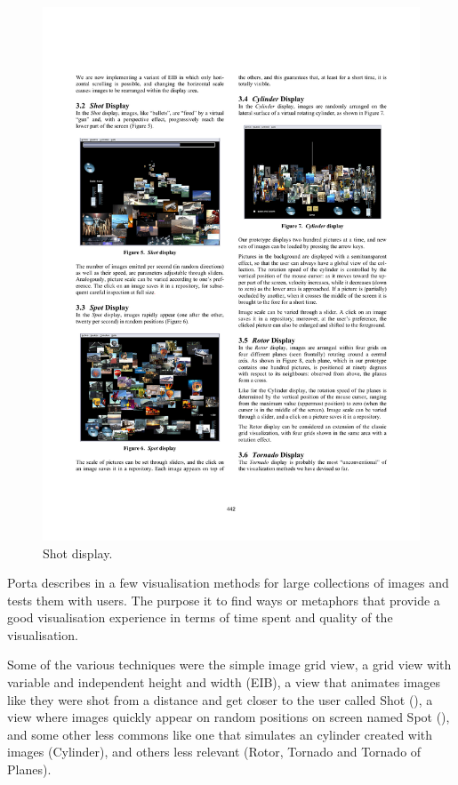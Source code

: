 \begin{figure}[ht]
\begin{minipage}[b]{0.5\textwidth}
		\includegraphics[width=\textwidth]{imgs/Porta-shot}
		\caption{Shot display.}
		\label{fig:porta-shot}
	\end{minipage}
\end{figure}

Porta describes in \cite{Porta:2006p416} a few visualisation methods for large collections of images and tests them with users. The purpose it to find ways or metaphors that provide a good visualisation experience in terms of time spent and quality of the visualisation.

Some of the various techniques were the simple image grid view, a grid view with variable and independent height and width (EIB), a view that animates images like they were shot from a distance and get closer to the user called Shot (), a view where images quickly appear on random positions on screen named Spot (), and some other less commons like one that simulates an cylinder created with images (Cylinder), and others less relevant (Rotor, Tornado and Tornado of Planes).

